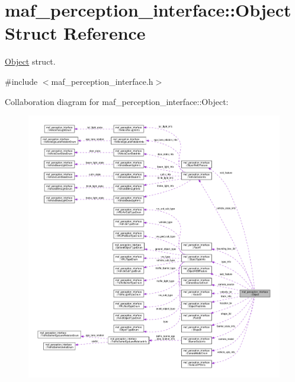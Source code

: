 \hypertarget{structmaf__perception__interface_1_1Object}{}\section{maf\+\_\+perception\+\_\+interface\+:\+:Object Struct Reference}
\label{structmaf__perception__interface_1_1Object}


\hyperlink{structmaf__perception__interface_1_1Object}{Object} struct.  




{\ttfamily \#include $<$maf\+\_\+perception\+\_\+interface.\+h$>$}



Collaboration diagram for maf\+\_\+perception\+\_\+interface\+:\+:Object\+:\nopagebreak
\begin{figure}[H]
\begin{center}
\leavevmode
\includegraphics[width=350pt]{structmaf__perception__interface_1_1Object__coll__graph}
\end{center}
\end{figure}
